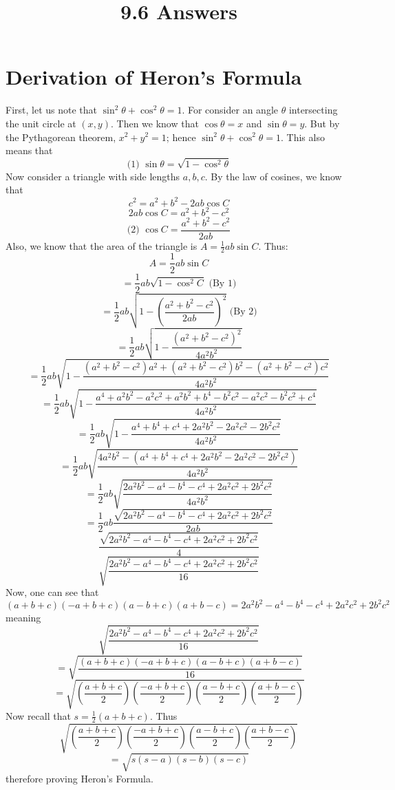 \documentclass{article}
\title{9.6 Answers}
\theoremstyle{definition}
\newcommand{\?}{\stackrel{?}{=}}
\begin{document}
\maketitle

\section*{Derivation of Heron's Formula}
First, let us note that $\sin^2\theta+\cos^2\theta=1$. For consider an angle $\theta$ intersecting the unit circle at $(x,y)$. Then we know that $\cos\theta=x$ and 
$\sin\theta=y$. But by the Pythagorean theorem, $x^2+y^2=1$; hence $\sin^2\theta+\cos^2\theta=1$. This also means that
\[ \textrm{(1) }\sin\theta=\sqrt{1-\cos^2\theta} \] Now consider a triangle with side lengths $a,b,c$. By the law of cosines, we know that
\[ c^2=a^2+b^2-2ab\cos C \]
\[ 2ab\cos C=a^2+b^2-c^2 \]
\[ \textrm{(2) }\cos C=\dfrac{a^2+b^2-c^2}{2ab} \]
Also, we know that the area of the triangle is $A=\frac{1}{2}ab\sin C$. Thus:
\[ A=\frac{1}{2}ab\sin C \]
\[ =\frac{1}{2}ab\sqrt{1-\cos^2 C}\textrm{ (By 1)} \]
\[ =\frac{1}{2}ab\sqrt{1-\left(\dfrac{a^2+b^2-c^2}{2ab}\right)^2}\textrm{ (By 2)} \]
\[ =\frac{1}{2}ab\sqrt{1-\dfrac{(a^2+b^2-c^2)^2}{4a^2b^2}} \]
\[ =\frac{1}{2}ab\sqrt{1-\dfrac{(a^2+b^2-c^2)a^2+(a^2+b^2-c^2)b^2-(a^2+b^2-c^2)c^2}{4a^2b^2}} \]
\[ =\frac{1}{2}ab\sqrt{1-\dfrac{a^4+a^2b^2-a^2c^2+a^2b^2+b^4-b^2c^2-a^2c^2-b^2c^2+c^4}{4a^2b^2}} \]
\[ =\frac{1}{2}ab\sqrt{1-\dfrac{a^4+b^4+c^4+2a^2b^2-2a^2c^2-2b^2c^2}{4a^2b^2}} \]
\[ =\frac{1}{2}ab\sqrt{\dfrac{4a^2b^2-(a^4+b^4+c^4+2a^2b^2-2a^2c^2-2b^2c^2)}{4a^2b^2}} \]
\[ =\frac{1}{2}ab\sqrt{\dfrac{2a^2b^2-a^4-b^4-c^4+2a^2c^2+2b^2c^2}{4a^2b^2}} \]
\[ =\frac{1}{2}ab\dfrac{\sqrt{2a^2b^2-a^4-b^4-c^4+2a^2c^2+2b^2c^2}}{2ab} \]
\[ \dfrac{\sqrt{2a^2b^2-a^4-b^4-c^4+2a^2c^2+2b^2c^2}}{4} \]
\[ \sqrt{\dfrac{2a^2b^2-a^4-b^4-c^4+2a^2c^2+2b^2c^2}{16}} \]
Now, one can see that
\[ \left(a+b+c\right)\left(-a+b+c\right)\left(a-b+c\right)\left(a+b-c\right)=2a^2b^2-a^4-b^4-c^4+2a^2c^2+2b^2c^2 \] meaning
\[ \sqrt{\dfrac{2a^2b^2-a^4-b^4-c^4+2a^2c^2+2b^2c^2}{16}} \]
\[ =\sqrt{\dfrac{\left(a+b+c\right)\left(-a+b+c\right)\left(a-b+c\right)\left(a+b-c\right)}{16}} \]
\[ =\sqrt{\left(\frac{a+b+c}{2}\right)\left(\frac{-a+b+c}{2}\right)\left(\frac{a-b+c}{2}\right)\left(\frac{a+b-c}{2}\right)} \]
Now recall that $s=\frac{1}{2}(a+b+c)$. Thus
\[ \sqrt{\left(\frac{a+b+c}{2}\right)\left(\frac{-a+b+c}{2}\right)\left(\frac{a-b+c}{2}\right)\left(\frac{a+b-c}{2}\right)} \]
\[ =\sqrt{s(s-a)(s-b)(s-c)} \] therefore proving Heron's Formula.
\end{document}
